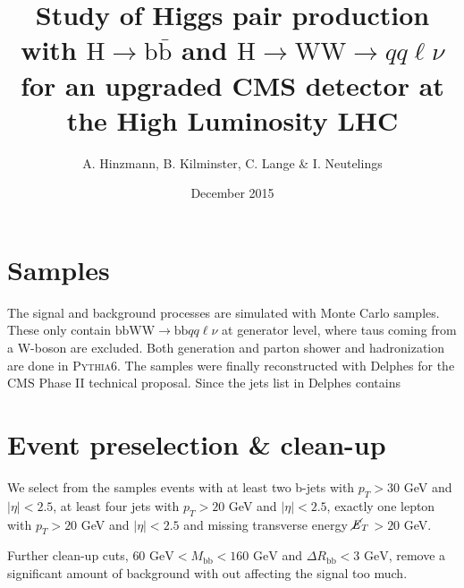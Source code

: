\documentclass[10pt,a4paper]{article}
\title{Study of Higgs pair production with $\text{H} \rightarrow \text{b}\bar{\text{b}}$ and $\text{H} \rightarrow \text{WW} \rightarrow qq\ell\nu$ for an upgraded CMS detector at the High Luminosity LHC}
\author{A. Hinzmann, B. Kilminster, C. Lange \& I. Neutelings}
\affil{University of Zurich}
\date{December 2015}
\newcommand{\W}{\text{W}}
\renewcommand{\b}{\text{b}}
\newcommand{\di}{$\rightarrow$ bbWW $\rightarrow$ bb$\ell\nu \ell\nu$}
\newcommand{\semi}{$\rightarrow$ bbWW $\rightarrow$ bb$qq\ell\nu$}
\newcommand{\etal}{\emph{et al.}}
\newcommand{\MET}{\ensuremath{\cancel{\it{E}}_{T}}}
\begin{document}
\maketitle









\section{Samples}

The signal and background processes are simulated with Monte Carlo samples. These only contain \mbox{$\b\b\W\W \rightarrow \b\b qq\ell\nu$} at generator level, where taus coming from a W-boson are excluded. Both generation and parton shower and hadronization are done in \textsc{Pythia6}. The samples were finally reconstructed with Delphes for the CMS Phase II technical proposal. %
Since the jets list in Delphes contains 





\section{Event preselection \& clean-up}
We select from the samples events with at least two b-jets with $p_T > 30$ GeV and $|\eta| < 2.5$, at least four jets with $p_T > 20$ GeV and $|\eta| < 2.5$, exactly one lepton with $p_T > 20$ GeV and $|\eta| < 2.5$ and missing transverse energy \MET $> 20$ GeV.

Further clean-up cuts, $60 \text{ GeV} < M_{\b\b} < 160 \text{ GeV}$ and $\Delta R_{\b\b} < 3 \text{ GeV}$, remove a significant amount of background with out affecting the signal too much.
\end{document}
